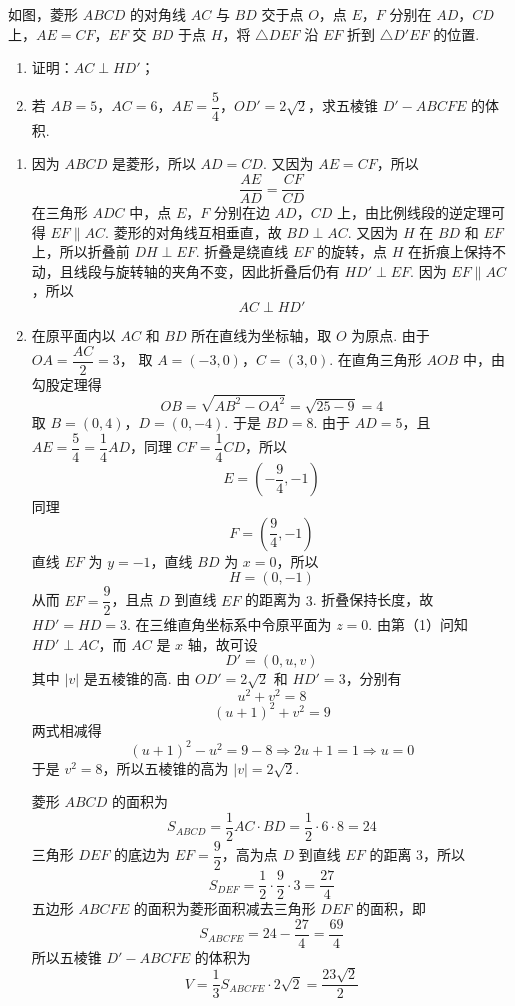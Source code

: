 \begin{problem}
如图，菱形 \(ABCD\) 的对角线 \(AC\) 与 \(BD\) 交于点 \(O\)，点 \(E\)，\(F\) 分别在 \(AD\)，\(CD\) 上，\(AE=CF\)，\(EF\) 交 \(BD\) 于点 \(H\)，将 \(\triangle DEF\) 沿 \(EF\) 折到 \(\triangle D'EF\) 的位置.
\begin{enumerate}
\item 证明：\(AC\perp HD'\)；
\item 若 \(AB=5\)，\(AC=6\)，\(AE=\dfrac54\)，\(OD'=2\sqrt2\)，求五棱锥 \(D'-ABCFE\) 的体积.
\end{enumerate}

\begingroup
{}
\endgroup
\end{problem}

\begin{solution}
\begin{enumerate}
\item 因为 \(ABCD\) 是菱形，所以 \(AD=CD\). 又因为 \(AE=CF\)，所以
\[
\dfrac{AE}{AD}=\dfrac{CF}{CD}
\]
在三角形 \(ADC\) 中，点 \(E\)，\(F\) 分别在边 \(AD\)，\(CD\) 上，由比例线段的逆定理可得 \(EF\parallel AC\). 菱形的对角线互相垂直，故 \(BD\perp AC\). 又因为 \(H\) 在 \(BD\) 和 \(EF\) 上，所以折叠前 \(DH\perp EF\). 折叠是绕直线 \(EF\) 的旋转，点 \(H\) 在折痕上保持不动，且线段与旋转轴的夹角不变，因此折叠后仍有 \(HD'\perp EF\). 因为 \(EF\parallel AC\)，所以
\[
AC\perp HD'
\]

\item 在原平面内以 \(AC\) 和 \(BD\) 所在直线为坐标轴，取 \(O\) 为原点. 由于 \(OA=\dfrac{AC}{2}=3\)，
取 \(A=(-3,0)\)，\(C=(3,0)\).
在直角三角形 \(AOB\) 中，由勾股定理得
\[
OB=\sqrt{AB^2-OA^2}=\sqrt{25-9}=4
\]
取 \(B=(0,4)\)，\(D=(0,-4)\).
于是 \(BD=8\). 由于 \(AD=5\)，且 \(AE=\dfrac54=\dfrac14AD\)，同理 \(CF=\dfrac14CD\)，所以
\[
E=\left(-\dfrac94,-1\right)
\]
同理
\[
F=\left(\dfrac94,-1\right)
\]
直线 \(EF\) 为 \(y=-1\)，直线 \(BD\) 为 \(x=0\)，所以
\[
H=(0,-1)
\]
从而 \(EF=\dfrac92\)，且点 \(D\) 到直线 \(EF\) 的距离为 \(3\). 折叠保持长度，故 \(HD'=HD=3\). 在三维直角坐标系中令原平面为 \(z=0\). 由第（1）问知 \(HD'\perp AC\)，而 \(AC\) 是 \(x\) 轴，故可设
\[
D'=(0,u,v)
\]
其中 \(\lvert v\rvert\) 是五棱锥的高. 由 \(OD'=2\sqrt2\) 和 \(HD'=3\)，分别有
\[
u^2+v^2=8
\]
\[
(u+1)^2+v^2=9
\]
两式相减得
\[
(u+1)^2-u^2=9-8\Longrightarrow 2u+1=1\Longrightarrow u=0
\]
于是 \(v^2=8\)，所以五棱锥的高为 \(\lvert v\rvert=2\sqrt2\).

菱形 \(ABCD\) 的面积为
\[
S_{ABCD}=\dfrac12AC\cdot BD=\dfrac12\cdot6\cdot8=24
\]
三角形 \(DEF\) 的底边为 \(EF=\dfrac92\)，高为点 \(D\) 到直线 \(EF\) 的距离 \(3\)，所以
\[
S_{DEF}=\dfrac12\cdot\dfrac92\cdot3=\dfrac{27}{4}
\]
五边形 \(ABCFE\) 的面积为菱形面积减去三角形 \(DEF\) 的面积，即
\[
S_{ABCFE}=24-\dfrac{27}{4}=\dfrac{69}{4}
\]
所以五棱锥 \(D'-ABCFE\) 的体积为
\[
V=\dfrac13S_{ABCFE}\cdot2\sqrt2=\dfrac{23\sqrt2}{2}
\]
\end{enumerate}
\end{solution}


